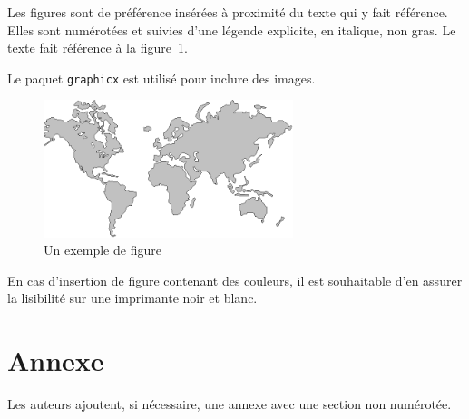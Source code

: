 \documentclass[city=Montpellier,year=2013]{jres}
\begin{document}
Les figures sont de préférence insérées à proximité du texte qui y
fait référence. Elles sont numérotées et suivies d'une légende
explicite, en italique, non gras. Le texte fait référence à la
figure~\ref{fig-exemple}.

Le paquet \texttt{graphicx} est utilisé pour inclure des images.

\begin{figure}
    \centerline{\includegraphics[height=4cm]{figure}}
    \caption{Un exemple de figure}
    \label{fig-exemple}
\end{figure}

En cas d'insertion de figure contenant des couleurs, il est souhaitable
d'en assurer la lisibilité sur une imprimante noir et blanc.

\section*{Annexe}

Les auteurs ajoutent, si nécessaire, une annexe avec une section non
numérotée.

\nocite{*}

\end{document}
